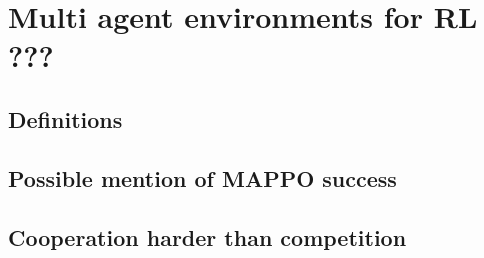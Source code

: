 \chapter{Multi agent environments for RL ???}

\section{Definitions}

\section{Possible mention of MAPPO success}
\section{Cooperation harder than competition}

